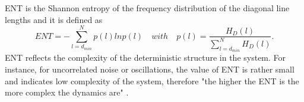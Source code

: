ENT is the Shannon entropy of the frequency distribution of the diagonal line 
lengths and it is defined as
\begin{equation}
	ENT= - \sum^{N}_{l=d_{min}} p(l) ln p(l) \quad with \quad 
		p(l)=\frac{ H_D(l) }{ \sum^{N}_{ l=d_{min} } H_D(l) }.
\end{equation}
ENT reflects the complexity of the deterministic structure in the system.
For instance, for uncorrelated noise or oscillations, 
the value of ENT is rather small and indicates low complexity of the system,
therefore "the higher the ENT is the more complex the dynamics are" 
\citep[p. 15]{marwan2015}.
%
%

 


